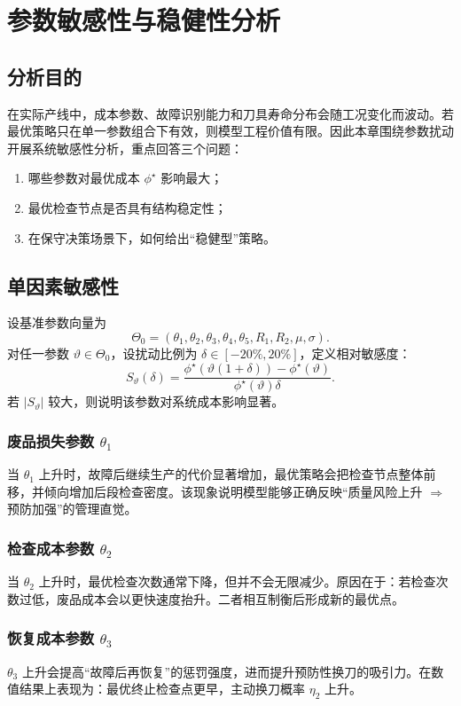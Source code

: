 \chapter{参数敏感性与稳健性分析}

\section{分析目的}
在实际产线中，成本参数、故障识别能力和刀具寿命分布会随工况变化而波动。若最优策略只在单一参数组合下有效，则模型工程价值有限。因此本章围绕参数扰动开展系统敏感性分析，重点回答三个问题：
\begin{enumerate}
  \item 哪些参数对最优成本 $\phi^\star$ 影响最大；
  \item 最优检查节点是否具有结构稳定性；
  \item 在保守决策场景下，如何给出“稳健型”策略。
\end{enumerate}

\section{单因素敏感性}
设基准参数向量为
\[
\Theta_0=(\theta_1,\theta_2,\theta_3,\theta_4,\theta_5,R_1,R_2,\mu,\sigma).
\]
对任一参数 $\vartheta\in\Theta_0$，设扰动比例为 $\delta\in[-20\%,20\%]$，定义相对敏感度：
\[
S_{\vartheta}(\delta)=\frac{\phi^\star(\vartheta(1+\delta))-\phi^\star(\vartheta)}{\phi^\star(\vartheta)\delta}.
\]
若 $|S_{\vartheta}|$ 较大，则说明该参数对系统成本影响显著。

\subsection{废品损失参数 $\theta_1$}
当 $\theta_1$ 上升时，故障后继续生产的代价显著增加，最优策略会把检查节点整体前移，并倾向增加后段检查密度。该现象说明模型能够正确反映“质量风险上升 $\Rightarrow$ 预防加强”的管理直觉。

\subsection{检查成本参数 $\theta_2$}
当 $\theta_2$ 上升时，最优检查次数通常下降，但并不会无限减少。原因在于：若检查次数过低，废品成本会以更快速度抬升。二者相互制衡后形成新的最优点。

\subsection{恢复成本参数 $\theta_3$}
$\theta_3$ 上升会提高“故障后再恢复”的惩罚强度，进而提升预防性换刀的吸引力。在数值结果上表现为：最优终止检查点更早，主动换刀概率 $\eta_2$ 上升。

